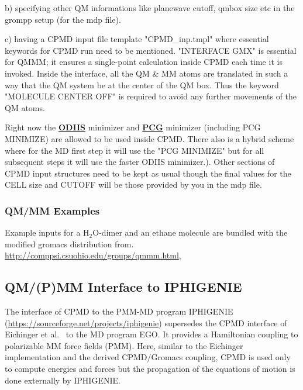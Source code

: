 \documentclass[twoside,10pt,titlepage,a4paper]{article}
\newcommand{\referto}[2]{\hyperlink{#1}{#2}}
\newcommand{\referto}[2]{\htmlref{#2}{#1}}
\newcommand{\htref}[2]{\href{#1}{#2}}
\newcommand{\htref}[2]{\htmladdnormallink{#2}{#1}}
\newcommand{\refkeyword}[1]{%
\referto{#1}{\textbf{#1}}%
\index{#1}%
}%
\begin{document}
b) specifying other QM informations like planewave cutoff, qmbox size etc
in the grompp setup (for the mdp file).

c) having a CPMD input file template "CPMD\_inp.tmpl" where essential keywords
for CPMD run need to be mentioned. "INTERFACE GMX" is essential for QMMM; it
ensures a single-point calculation inside CPMD each time it is invoked. Inside the
interface, all the QM \& MM atoms are translated in such a way that the QM system
be at the center of the QM box. Thus the keyword "MOLECULE CENTER OFF" is required
to avoid any further movements of the QM atoms.

Right now the \refkeyword{ODIIS} minimizer and \refkeyword{PCG} minimizer
(including PCG MINIMIZE) are allowed to be used inside CPMD.
There also is a hybrid scheme where for the MD first step it will  use the
"PCG MINIMIZE" but for all subsequent steps it will use the faster ODIIS
minimizer.). Other sections of CPMD input structures need to be kept as usual
though the final values for the CELL size and CUTOFF will be those provided
by you in the mdp file.

\subsubsection{QM/MM Examples}
Example inputs for a H${}_2$O-dimer and an ethane molecule are bundled with the modified
gromacs distribution from. \\
\htref{http://comppsi.csuohio.edu/groups/qmmm.html}{http://comppsi.csuohio.edu/groups/qmmm.html},

\subsection{QM/(P)MM Interface to IPHIGENIE}
The interface of CPMD to the PMM-MD program IPHIGENIE\cite{Schwoerer2013,Schwoerer2015} (\url{https://sourceforge.net/projects/iphigenie})
supersedes the 
CPMD interface of Eichinger et al.\ \cite{egoqmmm} to the MD program EGO.\cite{ego1}
It provides a Hamiltonian coupling to polarizable MM force fields (PMM).
Here, similar to the Eichinger implementation and the derived CPMD/Gromacs coupling\cite{gmxqmmm},
CPMD is used only to compute energies and forces 
but the propagation of the equations of motion is done
externally by IPHIGENIE. 
\end{document}
